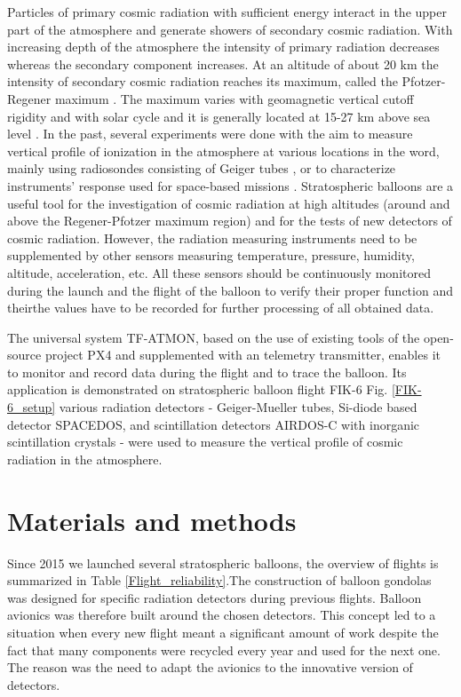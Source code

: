 \documentclass{Rpd}
\begin{document}
Particles of primary cosmic radiation with sufficient energy interact in the upper part of the atmosphere and generate showers of secondary cosmic radiation. With increasing depth of the atmosphere the intensity of primary radiation decreases whereas the secondary component increases. At an altitude of about 20 km the intensity of secondary cosmic radiation reaches its maximum, called the Pfotzer-Regener maximum \cite{Regener, Pfotzer}. The maximum varies with geomagnetic vertical cutoff rigidity and with solar cycle and it is generally located at 15-27 km above sea level \cite{Bazilevskaya}.
In the past, several experiments were done with the aim to measure vertical profile of ionization in the atmosphere at various locations in the word, mainly using radiosondes consisting of Geiger tubes \cite{Bazilevskaya, ionization_profile, Vertical_profile_measurements, cosmic_ray_intensity, Radioactivity_atmosphere}, or to characterize instruments’ response used for space-based missions \cite{Lawrence, Mukherjee, Timepix}.
Stratospheric balloons are a useful tool for the investigation of cosmic radiation at high altitudes (around and above the Regener-Pfotzer maximum region) and for the tests of new detectors of cosmic radiation.
However, the radiation measuring instruments need to be supplemented by other sensors measuring temperature, pressure, humidity, altitude, acceleration, etc.  All these sensors should be continuously monitored during the launch and the flight of the balloon to verify their proper function and theirthe values have to be recorded for further processing of all obtained data.

The universal system TF-ATMON, based on the use of existing tools of the open-source project PX4 and supplemented with an telemetry transmitter, enables it to monitor and record data during the flight and to trace the balloon. Its application is demonstrated on stratospheric balloon flight FIK-6 Fig. \ref{FIK-6_setup} various radiation detectors - Geiger-Mueller tubes, Si-diode based detector SPACEDOS, and scintillation detectors AIRDOS-C with inorganic scintillation crystals - were used to measure the vertical profile of cosmic radiation in the atmosphere.

\section{Materials and methods}

Since 2015 we launched several stratospheric balloons, the overview of flights is summarized in Table \ref{Flight_reliability}.The construction of balloon gondolas was designed for specific radiation detectors during previous flights. Balloon avionics was therefore built around the chosen detectors.
This concept led to a situation when every new flight meant a significant amount of work despite the fact that many components were recycled every year and used for the next one. The reason was the need to adapt the avionics to the innovative version of detectors.
\end{document}
